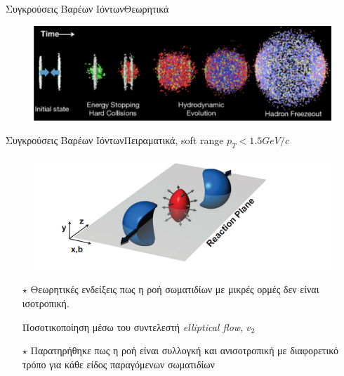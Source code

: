\documentclass[18pt,notheorems,hyperref={pdfauthor=whatever}]{beamer}
\begin{document}

\begin{frame}{Συγκρούσεις Βαρέων Ιόντων}{Θεωρητικά}
    \begin{figure}
        \centering
        \includegraphics[scale=1.2]{images/QGP_formation2.png}
    \end{figure}
\end{frame}

\begin{frame}{Συγκρούσεις Βαρέων Ιόντων}{Πειραματικά, soft range $p_T<1.5GeV/c$}
    \begin{minipage}{0.47\textwidth}
        \begin{figure}
            \centering
            \includegraphics[scale=0.5]{images/ion_collisions_elliptic.png}
        \end{figure}
    \end{minipage}
    \begin{minipage}{0.5\textwidth}
        \begin{itemize}
            \item[$\star$] Θεωρητικές ενδείξεις πως η ροή σωματιδίων με μικρές ορμές δεν είναι ισοτροπική. 

            Ποσοτικοποίηση μέσω του συντελεστή \textit{elliptical flow}, $v_2$

            \item[$\star$] Παρατηρήθηκε πως η ροή είναι συλλογκή και ανισοτροπική με διαφορετικό τρόπο για κάθε είδος παραγόμενων σωματιδίων
        \end{itemize}
    \end{minipage}
\end{frame}
\end{document}
